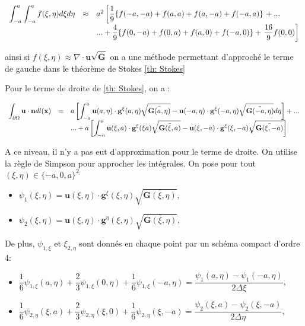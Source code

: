 \begin{equation}
\begin{array}{rcl}
\displaystyle\int_{-a}^a \displaystyle\int_{-a}^a f(\xi, \eta)d\xi d\eta & \approx & a^2 \left[ \dfrac{1}{9} \lbrace  f(-a,-a) + f(a,a) + f(a,-a) + f(-a,a) \rbrace \right. + ...\\
& & ...+ \dfrac{4}{9} \lbrace  f(0,-a) + f(0,a) + f(a,0) + f(-a,0) \rbrace +  \left. \dfrac{16}{9} f(0,0) \right]
\end{array}
\end{equation}

ainsi si $f(\xi, \eta) \approx \nabla \cdot \mathbf{u} \sqrt{\bar{\mathbf{G}}}$ on a une méthode permettant d'approché le terme de gauche dans le théorème de Stokes \ref{th: Stokes}

Pour le terme de droite de \ref{th: Stokes}, on a :

\begin{equation}
\begin{array}{rcl}
\displaystyle\int_{\partial \Omega} \mathbf{u} \cdot \mathbf{n} dl(\mathbf{x}) & = & a \left[ \displaystyle\int_{-a}^a \mathbf{u}(a,\eta) \cdot \mathbf{g}^{\xi} (a, \eta) \sqrt{\bar{\mathbf{G}(a,\eta)}}- \mathbf{u}(-a,\eta) \cdot \mathbf{g}^{\xi} (-a, \eta) \sqrt{\bar{\mathbf{G}(-a,\eta)}} d\eta \right]+ ...\\
&  & ... + a \left[ \displaystyle\int_{-a}^a \mathbf{u}(\xi,a) \cdot \mathbf{g}^{\xi} (\xi a) \sqrt{\bar{\mathbf{G}(\xi,a)}}- \mathbf{u}(\xi,-a) \cdot \mathbf{g}^{\xi} (\xi, -a) \sqrt{\bar{\mathbf{G}(\xi,-a)}}\right]
\end{array}
\label{eq: quadrature simpson L}
\end{equation}

A ce niveau, il n'y a pas eut d'approximation pour le terme de droite. On utilise la règle de Simpson pour approcher les intégrales. On pose pour tout $(\xi, \eta) \in \lbrace -a, 0, a \rbrace^2$

\begin{itemize}
\item $\psi_1(\xi, \eta) = \mathbf{u}(\xi, \eta) \cdot \mathbf{g}^{\xi}(\xi, \eta) \sqrt{\bar{\mathbf{G}(\xi, \eta)}}$,
\item $\psi_2(\xi, \eta) = \mathbf{u}(\xi, \eta) \cdot \mathbf{g}^{\eta}(\xi, \eta) \sqrt{\bar{\mathbf{G}(\xi, \eta)}}$,
\end{itemize}

De plus, $\psi_{1,\xi}$ et $\xi_{2,\eta}$ sont donnés en chaque point par un schéma compact d'ordre 4:

\begin{itemize}
\item $\dfrac{1}{6}\psi_{1,\xi}(a, \eta)+\dfrac{2}{3}\psi_{1,\xi}(0, \eta)+\dfrac{1}{6}\psi_{1,\xi}(-a, \eta) = \dfrac{\psi_1(a,\eta)-\psi_1(-a,\eta)}{2 \Delta \xi}$,
\item $\dfrac{1}{6}\psi_{2,\eta}(\xi,a)+\dfrac{2}{3}\psi_{2,\eta}(\xi,0)+\dfrac{1}{6}\psi_{2,\eta}(\xi,-a) = \dfrac{\psi_2(\xi,a)-\psi_2(\xi,-a)}{2 \Delta \eta}$,
\end{itemize}

